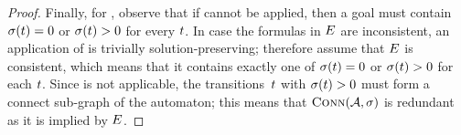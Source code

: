 \begin{proof}
  Finally, for \Subsume{}, observe that if \Split{} cannot be applied,
  then a goal must contain~$\operatorname{\sigma}(t) = 0$ or
  $\operatorname{\sigma}(t) > 0$ for every $t$. In case the
  formulas in $E$ are inconsistent, an application of
  \Subsume{} is trivially solution-preserving; therefore assume that
  $E$ is consistent, which means that it contains
  exactly one of $\operatorname{\sigma}(t) = 0$ or
  $\operatorname{\sigma}(t) > 0$ for each $t$. Since
  \Propagate{} is not applicable, the transitions~$t$ with
  $\operatorname{\sigma}(t) > 0$ must form a connect sub-graph of the
  automaton; this means that $\operatorname{\textsc{Conn}}(\mathcal{A}, \operatorname{\sigma})$ is
  redundant as it is implied by $E$.
\end{proof}

